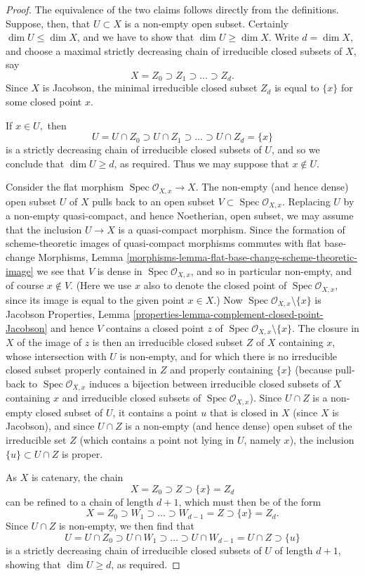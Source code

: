 \documentclass{stacks-project}
\theoremstyle{plain}
\theoremstyle{definition}
\theoremstyle{remark}
\numberwithin{equation}{subsection}
\def\Spec{\mathop{\mathrm{Spec}}}
\begin{document}
\begin{proof}
The equivalence of the two claims follows directly from the
definitions.   Suppose, then, that $U\subset X$ is a non-empty open
subset.
Certainly $\dim U \leq \dim X$, and we have to show
that $\dim U \geq \dim X.$
Write $d = \dim X$, and choose a maximal strictly
decreasing chain of irreducible closed subsets
of $X$, say
$$
X = Z_0 \supset Z_1 \supset \ldots \supset Z_d.
$$
Since $X$ is Jacobson, the minimal irreducible closed
subset $Z_d$ is equal to $\{x\}$ for some closed
point $x$.

\medskip\noindent
If $x \in U,$ then
$$
U = U \cap Z_0  \supset U\cap Z_1 \supset \ldots \supset
U\cap Z_d = \{x\}
$$
is a strictly decreasing chain of irreducible closed
subsets of $U$, and so we conclude that $\dim U \geq d$,
as required.  Thus we may suppose that $x \not\in U.$

\medskip\noindent
Consider the flat morphism $\Spec \mathcal{O}_{X,x} \to X$.
The non-empty (and hence dense) open subset $U$ of $X$
pulls back to an open subset $V \subset \Spec \mathcal{O}_{X,x}$.
Replacing $U$ by a non-empty quasi-compact, and hence
Noetherian, open subset, we may assume that the inclusion
$U \to X$ is a quasi-compact morphism.  Since the
formation of scheme-theoretic images of quasi-compact
morphisms commutes with flat base-change
Morphisms, Lemma
\ref{morphisms-lemma-flat-base-change-scheme-theoretic-image}
we see that $V$ is dense in $\Spec \mathcal{O}_{X,x}$,
and so in particular non-empty,
and of course $x \not\in V.$  (Here we use $x$ also to denote
the closed point of $\Spec \mathcal{O}_{X,x}$, since its image
is equal to the given point $x \in X$.)
Now $\Spec \mathcal{O}_{X,x} \setminus \{x\}$ is Jacobson
Properties, Lemma
\ref{properties-lemma-complement-closed-point-Jacobson}
and hence $V$ contains a closed point $z$
of $\Spec \mathcal{O}_{X,x} \setminus \{x\}$.  The closure
in $X$ of the image of $z$ is then an irreducible
closed subset $Z$ of $X$ containing $x$, whose intersection
with $U$ is non-empty, and
for which there is no irreducible closed
subset properly contained in $Z$
and properly containing $\{x\}$
(because pull-back to $\Spec \mathcal{O}_{X,x}$ induces
a bijection between irreducible closed subsets of $X$
containing $x$ and irreducible closed subsets of $\Spec
\mathcal{O}_{X,x}$).
Since $U \cap Z$ is a non-empty closed subset of $U$,
it contains a point $u$ that is closed in $X$ (since
$X$ is Jacobson), and since $U\cap Z$
is a non-empty (and hence dense) open subset of the irreducible set $Z$
(which contains a point not lying in $U$, namely $x$),
the inclusion $\{u\} \subset U\cap Z$ is proper.

\medskip\noindent
As $X$ is catenary, the chain
$$
X = Z_0 \supset Z \supset \{x\} = Z_d
$$
can be refined to a chain of length $d+1$, which must then
be of the form
$$
X = Z_0 \supset W_1 \supset \ldots \supset W_{d-1} = Z \supset \{x\} = Z_d.
$$
Since $U\cap Z$ is non-empty, we then find that
$$
U = U \cap Z_0 \supset U \cap W_1\supset \ldots \supset U\cap W_{d-1}
= U\cap Z \supset \{u\}
$$
is a strictly decreasing chain of irreducible closed subsets
of $U$ of length $d+1$, showing that $\dim U \geq d$,
as required.
\end{proof}
\end{document}
